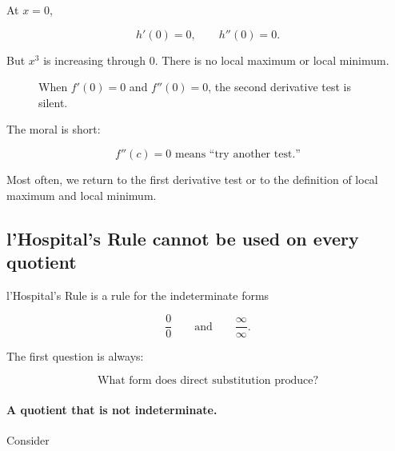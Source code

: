 At \(x=0\),

\[
h'(0)=0,
\qquad
h''(0)=0.
\]

But \(x^3\) is increasing through \(0\).  There is no local maximum or local minimum.

\begin{figure}[h]
\centering
{}
\caption{When \(f'(0)=0\) and \(f''(0)=0\), the second derivative test is silent.}
\label{fig:second-derivative-test-silent}
\end{figure}

The moral is short:

\[
\boxed{
f''(c)=0 \text{ means ``try another test.''}
}
\]

Most often, we return to the first derivative test or to the definition of local maximum
and local minimum.

\subsection{l'Hospital's Rule cannot be used on every quotient}
\label{subsec:lhospital-every-quotient-warning}

l'Hospital's Rule is a rule for the indeterminate forms

\[
\frac00
\qquad\text{and}\qquad
\frac{\infty}{\infty}.
\]

The first question is always:

\[
\text{What form does direct substitution produce?}
\]

\paragraph{A quotient that is not indeterminate.}
Consider

